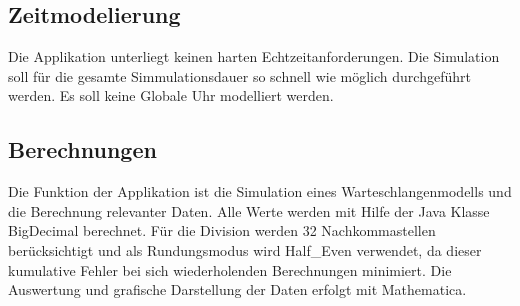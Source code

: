 \subsection{Zeitmodelierung}
Die Applikation unterliegt keinen harten Echtzeitanforderungen. Die Simulation soll für die gesamte Simmulationsdauer so schnell wie möglich durchgeführt werden. Es soll keine Globale Uhr modelliert werden.

\subsection{Berechnungen}
Die Funktion der Applikation ist die Simulation eines Warteschlangenmodells und die Berechnung relevanter Daten. Alle Werte werden mit Hilfe der Java Klasse BigDecimal berechnet. Für die Division werden 32 Nachkommastellen berücksichtigt und als Rundungsmodus wird Half\_Even verwendet, da dieser kumulative Fehler bei sich wiederholenden Berechnungen minimiert. 
Die Auswertung und grafische Darstellung der Daten erfolgt mit Mathematica. 

